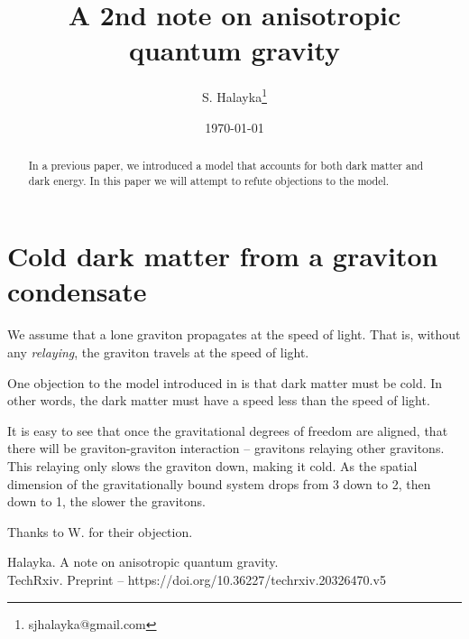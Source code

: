\documentclass[12pt]{article}
\title{A 2nd note on anisotropic quantum gravity}
\author{S. Halayka\footnote{sjhalayka@gmail.com}}
\date{\today\;\currenttime}
\begin{document}
 
\maketitle

\begin{abstract}
In a previous paper, we introduced a model that accounts for both dark matter and dark energy. In this paper we will attempt to refute objections to the model.
\end{abstract}


\section{Cold dark matter from a graviton condensate}

We assume that a lone graviton propagates at the speed of light. That is, without any {\textit{relaying}}, the graviton travels at the speed of light.

One objection to the model introduced in \cite{halayka} is that dark matter must be cold. In other words, the dark matter must have a speed less than the speed of light.

It is easy to see that once the gravitational degrees of freedom are aligned, that there will be graviton-graviton interaction -- gravitons relaying other gravitons. This relaying only slows the graviton down, making it cold. As the spatial dimension of the gravitationally bound system drops from 3 down to 2, then down to 1, the slower the gravitons.

Thanks to W. for their objection.




\begin{thebibliography}{9}

 Halayka. A note on anisotropic quantum gravity.\\TechRxiv. Preprint -- https://doi.org/10.36227/techrxiv.20326470.v5


\end{thebibliography}
\end{document}
